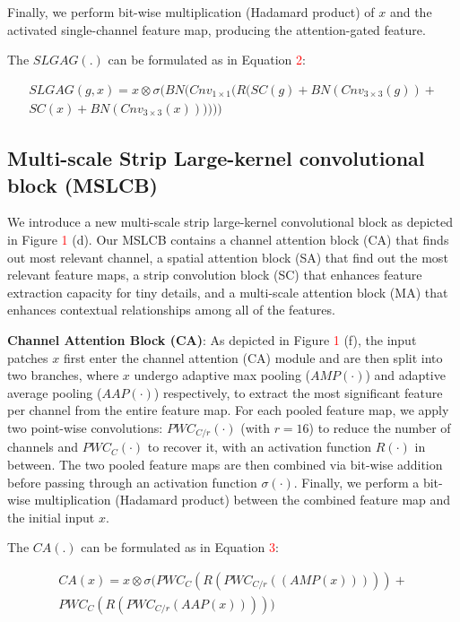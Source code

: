\documentclass[10pt, a4paper, twocolumn]{article}
\begin{document}
Finally, we perform bit-wise multiplication (Hadamard product) of $x$ and the activated single-channel feature map, producing the attention-gated feature.

The $SLGAG(.)$ can be formulated as in Equation \textcolor{red}{2}: 
\begin{scriptsize}
\begin{align}\nonumber
	SLGAG(g,x) = x \otimes \sigma(BN(Cnv_{1\times 1}(R(SC(g) + BN(Cnv_{3\times 3}(g)) + \\SC(x) + BN(Cnv_{3\times 3}(x))))))
\end{align}
\end{scriptsize}

\subsection{Multi-scale Strip Large-kernel convolutional block (MSLCB)}

We introduce a new multi-scale strip large-kernel convolutional block as depicted in Figure \textcolor{red}{1} (d). Our MSLCB contains a channel attention block (CA) that finds out most relevant channel, a spatial attention block (SA) that find out the most relevant feature maps, a strip convolution block (SC) that enhances feature extraction capacity for tiny details, and a multi-scale attention block (MA) that enhances contextual relationships among all of the features.

\textbf{Channel Attention Block (CA)}\cite{woo2018cbam}: As depicted in Figure \textcolor{red}{1} (f), the input patches $x$ first enter the channel attention (CA) module and are then split into two branches, where $x$ undergo adaptive max pooling\cite{he2014spatial} ($AMP(\cdot)$) and adaptive average pooling ($AAP(\cdot)$)\cite{he2014spatial} respectively, to extract the most significant feature per channel from the entire feature map. For each pooled feature map, we apply two point-wise convolutions\cite{lin2013network}: $PWC_{C/r}(\cdot)$ (with $r=16$) to reduce the number of channels and $PWC_C(\cdot)$ to recover it, with an activation function $R(\cdot)$ in between. The two pooled feature maps are then combined via bit-wise addition before passing through an activation function $\sigma(\cdot)$. Finally, we perform a bit-wise multiplication (Hadamard product) between the combined feature map and the initial input $x$.

The $CA(.)$ can be formulated as in Equation \textcolor{red}{3}:
\begin{scriptsize}   
\begin{align}
  CA(x) = x \otimes \sigma(PWC_{C}(R(PWC_{C/r}((AMP(x))))) + \nonumber
  \\PWC_{C}(R(PWC_{C/r}(AAP(x)))))
\end{align}
\end{scriptsize}
\end{document}
